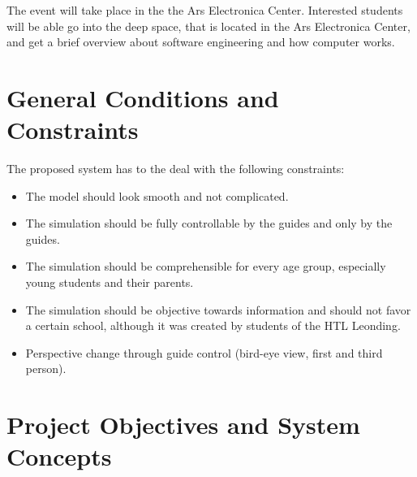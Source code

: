 \documentclass[12pt]{article}
\theoremstyle{definition}
\begin{document}
The event will take place in the the Ars Electronica Center. Interested students will be able go into the deep space, that is located in the Ars Electronica Center, and get a brief overview about software engineering and how computer works.

\pagebreak

\section{General Conditions and Constraints}

The proposed system has to the deal with the following constraints:
\begin{itemize}
\item The model should look smooth and not complicated. 
\item The simulation should be fully controllable by the guides and only by the guides.
\item The simulation should be comprehensible for every age group, especially young students and their parents.
\item The simulation should be objective towards information and should not favor a certain school, although it was created by students of the HTL Leonding.
\item Perspective change through guide control (bird-eye view, first and third person).
\end{itemize}
\pagebreak

\section{Project Objectives and System Concepts}
\end{document}
